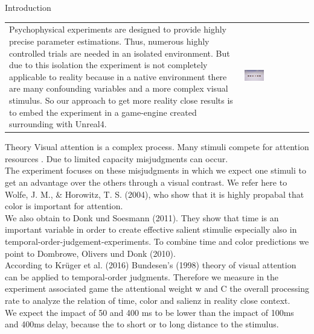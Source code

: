 \documentclass[a0paper,portrait]{baposter}
\begin{document}
\begin{poster}
{		}
		
		
		
		\begin{posterbox}[name=intro,span=2,column=0,row=0]{Introduction}
			\begin{tabular}{p{} p{}}
				Psychophysical experiments are designed to provide highly precise parameter estimations. Thus, numerous highly controlled trials are needed in an isolated environment. But due to this isolation the experiment is not completely applicable to reality because in a native environment there are many confounding variables and a more complex visual stimulus.
				So our approach to get more reality close results is to embed the experiment in a game-engine created surrounding with Unreal4.
				& 
				\vspace{-5pt}
				\includegraphics[width=0.32\textwidth]{Screenshots/playerDecision.png}\\
			\end{tabular}
			
		\end{posterbox}
		
		\begin{posterbox}[name=theory,column=0,row=1,below=intro]{Theory}
			\vspace{10pt}
			Visual attention is a complex process. Many stimuli compete for attention resources . Due to limited capacity misjudgments can occur.\\ The experiment focuses on these misjudgments in which we expect one stimuli to get an advantage over the others through a visual contrast. We refer here to Wolfe, J. M., \& Horowitz, T. S. (2004), who show that it is highly propabal that color is important for attention.\\
			 We also obtain to Donk und Soesmann (2011). They show that time is an important variable in order to create effective salient stimulie especially also in temporal-order-judgement-experiments. To combine time and color predictions we point to Dombrowe, Olivers und Donk (2010).\\ According to Krüger et al. (2016) Bundesen's (1998) theory of visual attention can be applied to temporal-order judgments. Therefore we measure in the experiment associated game the attentional weight w and C the overall processing rate to analyze the relation of time, color and salienz in reality close context.\\
			 We expect the impact of 50 and 400 ms to be lower than the impact of 100ms and 400ms delay, because the to short or to long distance to the stimulus.
			 \vspace{18pt}
		\end{posterbox}
		

\end{poster}
\end{document}
